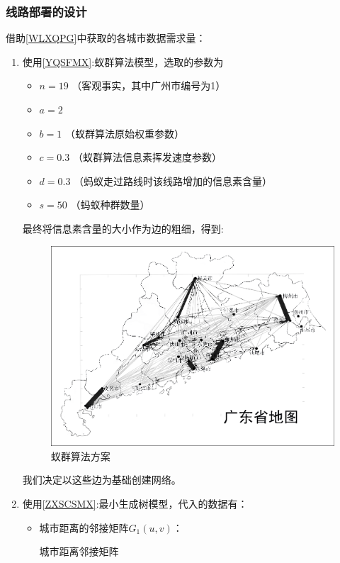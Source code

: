 \documentclass[UTF8,12pt]{ctexart}
\begin{document}
\subsubsection[线路部署位置]{线路部署的设计}
\noindent 借助\ref{WLXQPG}中获取的各城市数据需求量：
\begin{enumerate}
    \item 使用\ref{YQSFMX}:蚁群算法模型，选取的参数为
          \begin{itemize}
              \item $n=19$ （客观事实，其中广州市编号为1）
              \item $a=2$
              \item $b=1$ （蚁群算法原始权重参数）
              \item $c=0.3$ （蚁群算法信息素挥发速度参数）
              \item $d=0.3$ （蚂蚁走过路线时该线路增加的信息素含量）
              \item $s=50$ （蚂蚁种群数量）
          \end{itemize}
          最终将信息素含量的大小作为边的粗细，得到:
          \begin{figure}[H]
              \centering
              \includegraphics[scale=0.28]{YQSF.png}   %
              \caption{蚁群算法方案}
          \end{figure}
          我们决定以这些边为基础创建网络。

    \item 使用\ref{ZXSCSMX}:最小生成树模型，代入的数据有：
          \begin{itemize}
              \item 城市距离的邻接矩阵$G_1(u,v)$：
                    \begin{table}[H]
                        \caption{城市距离邻接矩阵}
                        \makebox[35em][c]{
                            \begin{scriptsize}


\end{scriptsize}}
\end{table}
\end{itemize}
\end{enumerate}
\end{document}
